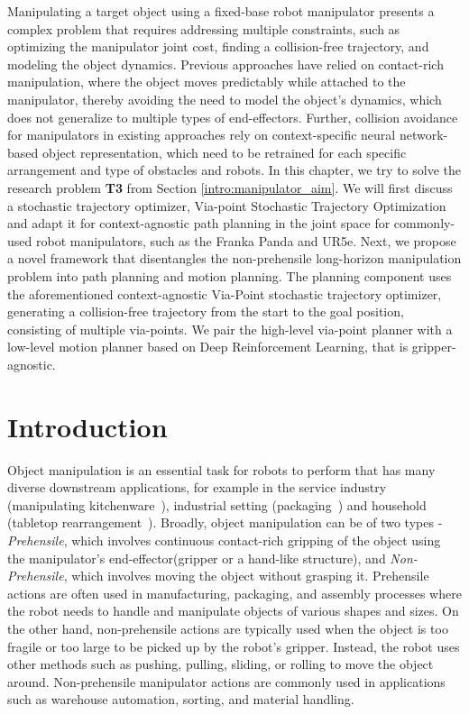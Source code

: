 Manipulating a target object using a fixed-base robot manipulator presents a complex problem that requires addressing multiple constraints, such as optimizing the manipulator joint cost, finding a collision-free trajectory, and modeling the object dynamics. Previous approaches have relied on contact-rich manipulation, where the object moves predictably while attached to the manipulator, thereby avoiding the need to model the object's dynamics, which does not generalize to multiple types of end-effectors. Further, collision avoidance for manipulators in existing approaches rely on context-specific neural network-based object representation, which need to be retrained for each specific arrangement and type of obstacles and robots.  
In this chapter, we try to solve the research problem \textbf{T3} from Section \ref{intro:manipulator_aim}. We will first discuss a stochastic trajectory optimizer, Via-point Stochastic Trajectory Optimization and adapt it for context-agnostic path planning in the joint space for commonly-used robot manipulators, such as the Franka Panda and UR5e. Next, we propose a novel framework that disentangles the non-prehensile long-horizon manipulation problem into path planning and motion planning. The planning component uses the aforementioned context-agnostic Via-Point stochastic trajectory optimizer, generating a collision-free trajectory from the start to the goal position, consisting of multiple via-points. We pair the high-level via-point planner with a low-level motion planner based on Deep Reinforcement Learning, that is gripper-agnostic. 

\section{Introduction}

Object manipulation is an essential task for robots to perform that has many diverse downstream applications, for example in the service industry (manipulating kitchenware~\cite{kitchen_arm}), industrial setting (packaging~\cite{industrial_arm}) and household (tabletop rearrangement~\cite{agarwal2022approaches}). Broadly, object manipulation can be of two types - \textit{Prehensile}, which involves continuous contact-rich gripping of the object using the manipulator's end-effector(gripper or a hand-like structure), and \textit{Non-Prehensile}, which involves moving the object without grasping it. Prehensile actions are often used in manufacturing, packaging, and assembly processes where the robot needs to handle and manipulate objects of various shapes and sizes. On the other hand, non-prehensile actions are typically used when the object is too fragile or too large to be picked up by the robot's gripper. Instead, the robot uses other methods such as pushing, pulling, sliding, or rolling to move the object around. Non-prehensile manipulator actions are commonly used in applications such as warehouse automation, sorting, and material handling.

